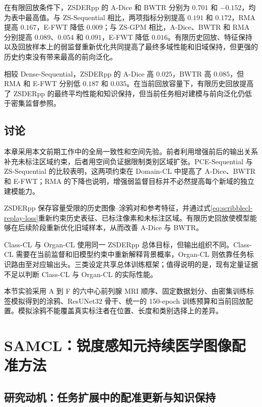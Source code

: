在有限回放条件下，ZSDERpp 的 A-Dice 和 BWTR 分别为 $0.701$ 和 $-0.152$，均为表中最高值。与 ZS-Sequential 相比，两项指标分别提高 $0.191$ 和 $0.172$，RMA 提高 $0.167$，E-FWT 降低 $0.009$；与 ZS-GPM 相比，A-Dice、BWTR 和 RMA 分别提高 $0.089$、$0.054$ 和 $0.091$，E-FWT 降低 $0.016$。有限历史回放、特征保持以及回放样本上的弱监督重新优化共同提高了最终多域性能和旧域保持，但更强的历史约束没有带来最高的前向泛化。

相较 Dense-Sequential，ZSDERpp 的 A-Dice 高 $0.025$，BWTR 高 $0.085$，但 RMA 和 E-FWT 分别低 $0.187$ 和 $0.035$。在当前回放容量下，有限历史回放提高了 ZSDERpp 的最终平均性能和知识保持，但当前任务相对建模与前向泛化仍低于密集监督参照。

\subsection{讨论}
\label{subsec:scribblecl-discussion}

本章采用本文前期工作中的全局一致性和空间先验\cite{zhang2026zscribbleseg}。前者利用增强前后的输出关系补充未标注区域约束，后者用空间负证据限制类别区域扩张。PCE-Sequential 与 ZS-Sequential 的比较表明，这两项约束在 Domain-CL 中提高了 A-Dice、BWTR 和 E-FWT；RMA 的下降也说明，增强弱监督目标并不必然提高每个新域的独立建模能力。

ZSDERpp 保存容量受限的历史图像--涂鸦对和参考特征，并通过式\eqref{eq:scribblecl-replay-loss}重新约束历史表征、已标注像素和未标注区域。有限历史回放使模型能够在后续阶段重新优化旧域样本，从而改善 A-Dice 与 BWTR。

Class-CL 与 Organ-CL 使用同一 ZSDERpp 总体目标，但输出组织不同。Class-CL 需要在当前监督和旧模型约束中重新解释背景概率，Organ-CL 则依靠任务标识路由至对应输出头。三类设定共享总体训练框架；值得说明的是，现有定量证据不足以判断 Class-CL 与 Organ-CL 的实际性能。

本节实验采用 A 到 F 的六中心前列腺 MRI 顺序、固定数据划分、由密集训练标签模拟得到的涂鸦、ResUNet32 骨干、统一的 150-epoch 训练预算和当前回放配置。模拟涂鸦不能覆盖真实标注者在位置、长度和类别选择上的差异。

\section{SAMCL：锐度感知元持续医学图像配准方法}
\label{sec:samcl}

\subsection{研究动机：任务扩展中的配准更新与知识保持}
\label{subsec:samcl-motivation}

